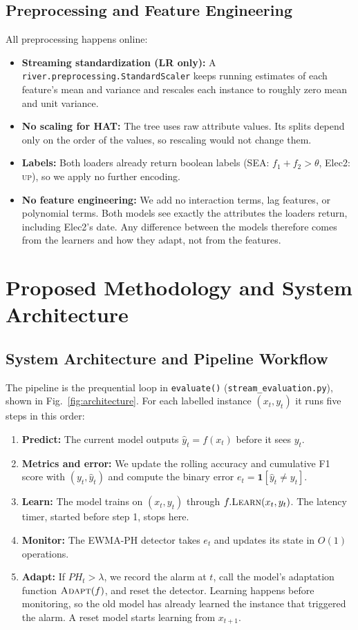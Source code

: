 \documentclass[conference]{IEEEtran}
\begin{document}
\subsection{Preprocessing and Feature Engineering}
All preprocessing happens online:
\begin{itemize}
    \item \textbf{Streaming standardization (LR only):} A \texttt{river.preprocessing.StandardScaler} keeps running estimates of each feature's mean and variance and rescales each instance to roughly zero mean and unit variance.
    \item \textbf{No scaling for HAT:} The tree uses raw attribute values. Its splits depend only on the order of the values, so rescaling would not change them.
    \item \textbf{Labels:} Both loaders already return boolean labels (SEA: $f_1 + f_2 > \theta$, Elec2: \textsc{up}), so we apply no further encoding.
    \item \textbf{No feature engineering:} We add no interaction terms, lag features, or polynomial terms. Both models see exactly the attributes the loaders return, including Elec2's date. Any difference between the models therefore comes from the learners and how they adapt, not from the features.
\end{itemize}

\section{Proposed Methodology and System Architecture}

\subsection{System Architecture and Pipeline Workflow}
The pipeline is the prequential loop in \texttt{evaluate()} (\texttt{stream\_evaluation.py}), shown in Fig.~\ref{fig:architecture}.
For each labelled instance $(x_t, y_t)$ it runs five steps in this order:
\begin{enumerate}
    \item \textbf{Predict:} The current model outputs $\hat{y}_t = f(x_t)$ before it sees $y_t$.
    \item \textbf{Metrics and error:} We update the rolling accuracy and cumulative F1 score with $(y_t, \hat{y}_t)$ and compute the binary error $e_t = \mathbf{1}[\hat{y}_t \neq y_t]$.
    \item \textbf{Learn:} The model trains on $(x_t, y_t)$ through $f.\textsc{Learn}(x_t, y_t)$. The latency timer, started before step 1, stops here.
    \item \textbf{Monitor:} The EWMA-PH detector takes $e_t$ and updates its state in $O(1)$ operations.
    \item \textbf{Adapt:} If $PH_t > \lambda$, we record the alarm at $t$, call the model's adaptation function $\textsc{Adapt}(f)$, and reset the detector. Learning happens before monitoring, so the old model has already learned the instance that triggered the alarm. A reset model starts learning from $x_{t+1}$.
\end{enumerate}
\end{document}
